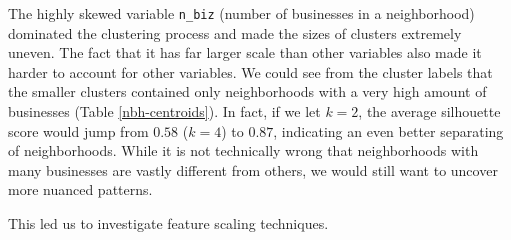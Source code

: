 \documentclass[compsoc]{IEEEtran}
\begin{document}
The highly skewed variable \texttt{n\_biz} (number of businesses in a neighborhood) dominated the clustering process and made the sizes of clusters extremely uneven. The fact that it has far larger scale than other variables also made it harder to account for other variables. We could see from the cluster labels that the smaller clusters contained only neighborhoods with a very high amount of businesses (Table \ref{nbh-centroids}). In fact, if we let $k = 2$, the average silhouette score would jump from $0.58$ ($k = 4$) to $0.87$, indicating an even better separating of neighborhoods. While it is not technically wrong that neighborhoods with many businesses are vastly different from others, we would still want to uncover more nuanced patterns.

This led us to investigate feature scaling techniques.
\end{document}
